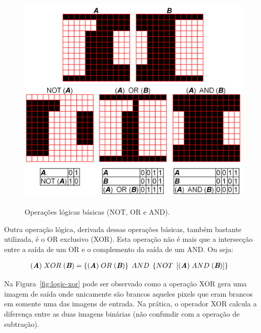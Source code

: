 \begin{figure} [h]
  \begin{center}
    \includegraphics[height=308pt,width=350pt]{images/fig_logic-basic}
    \caption{Operações lógicas básicas (NOT, OR e
      AND).}\label{fig:logic-basic}
  \end{center}
\end{figure}

Outra operação lógica, derivada dessas operações básicas, também
bastante utilizada, é o OR exclusivo (XOR). Esta operação não é mais
que a intersecção entre a saída de um OR e o complemento da saída de
um AND. Ou seja:

\begin{align}
 &(\textit{\textbf{A}}) \;  XOR \; (\textit{\textbf{B}}) = \left\lbrace (\textit{\textbf{A}}) \; OR \; (\textit{\textbf{B}}) \right\rbrace \; AND \; \left\lbrace  NOT \; \left[ (\textit{\textbf{A}}) \; AND \; (\textit{\textbf{B}}) \right] \right\rbrace
\end{align}

Na Figura~\ref{fig:logic-xor} pode ser observado como a operação XOR
gera uma imagem de saída onde unicamente são brancos aqueles pixels
que eram brancos em somente uma das imagens de entrada. Na prática, o
operador XOR calcula a diferença entre as duas imagens binárias (não
confundir com a operação de subtração).
 
